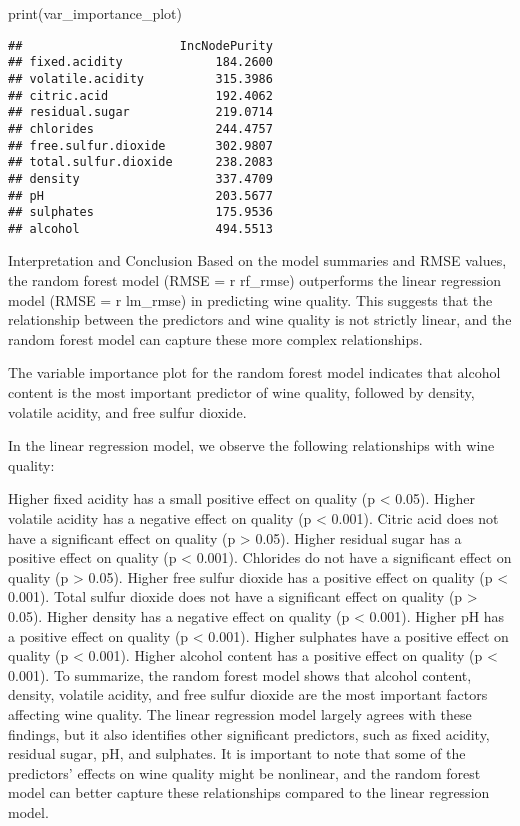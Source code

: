 \documentclass[
]{article}
\newenvironment{Shaded}{\begin{snugshade}}{\end{snugshade}}
\newcommand{\FunctionTok}[1]{\textcolor[rgb]{0.00,0.00,0.00}{#1}}
\newcommand{\NormalTok}[1]{#1}
\begin{document}
\begin{Shaded}
\begin{Highlighting}[]
\FunctionTok{print}\NormalTok{(var\_importance\_plot)}
\end{Highlighting}
\end{Shaded}

\begin{verbatim}
##                      IncNodePurity
## fixed.acidity             184.2600
## volatile.acidity          315.3986
## citric.acid               192.4062
## residual.sugar            219.0714
## chlorides                 244.4757
## free.sulfur.dioxide       302.9807
## total.sulfur.dioxide      238.2083
## density                   337.4709
## pH                        203.5677
## sulphates                 175.9536
## alcohol                   494.5513
\end{verbatim}

Interpretation and Conclusion Based on the model summaries and RMSE
values, the random forest model (RMSE = r rf\_rmse) outperforms the
linear regression model (RMSE = r lm\_rmse) in predicting wine quality.
This suggests that the relationship between the predictors and wine
quality is not strictly linear, and the random forest model can capture
these more complex relationships.

The variable importance plot for the random forest model indicates that
alcohol content is the most important predictor of wine quality,
followed by density, volatile acidity, and free sulfur dioxide.

In the linear regression model, we observe the following relationships
with wine quality:

Higher fixed acidity has a small positive effect on quality (p
\textless{} 0.05). Higher volatile acidity has a negative effect on
quality (p \textless{} 0.001). Citric acid does not have a significant
effect on quality (p \textgreater{} 0.05). Higher residual sugar has a
positive effect on quality (p \textless{} 0.001). Chlorides do not have
a significant effect on quality (p \textgreater{} 0.05). Higher free
sulfur dioxide has a positive effect on quality (p \textless{} 0.001).
Total sulfur dioxide does not have a significant effect on quality (p
\textgreater{} 0.05). Higher density has a negative effect on quality (p
\textless{} 0.001). Higher pH has a positive effect on quality (p
\textless{} 0.001). Higher sulphates have a positive effect on quality
(p \textless{} 0.001). Higher alcohol content has a positive effect on
quality (p \textless{} 0.001). To summarize, the random forest model
shows that alcohol content, density, volatile acidity, and free sulfur
dioxide are the most important factors affecting wine quality. The
linear regression model largely agrees with these findings, but it also
identifies other significant predictors, such as fixed acidity, residual
sugar, pH, and sulphates. It is important to note that some of the
predictors' effects on wine quality might be nonlinear, and the random
forest model can better capture these relationships compared to the
linear regression model.
\end{document}
